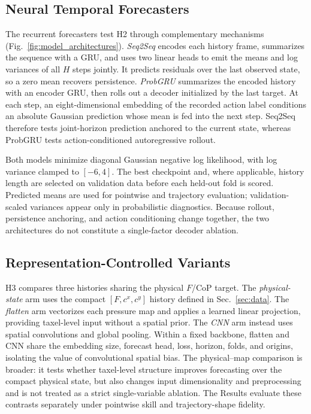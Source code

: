 \documentclass[letterpaper, 10 pt, conference]{ieeeconf}
\begin{document}
\subsection{Neural Temporal Forecasters}
The recurrent forecasters test H2 through complementary mechanisms (Fig.~\ref{fig:model_architectures}). \emph{Seq2Seq} encodes each history frame, summarizes the sequence with a GRU, and uses two linear heads to emit the means and log variances of all $H$ steps jointly. It predicts residuals over the last observed state, so a zero mean recovers persistence. \emph{ProbGRU} summarizes the encoded history with an encoder GRU, then rolls out a decoder initialized by the last target. At each step, an eight-dimensional embedding of the recorded action label conditions an absolute Gaussian prediction whose mean is fed into the next step. Seq2Seq therefore tests joint-horizon prediction anchored to the current state, whereas ProbGRU tests action-conditioned autoregressive rollout.

Both models minimize diagonal Gaussian negative log likelihood, with log variance clamped to $[-6,4]$. The best checkpoint and, where applicable, history length are selected on validation data before each held-out fold is scored. Predicted means are used for pointwise and trajectory evaluation; validation-scaled variances appear only in probabilistic diagnostics. Because rollout, persistence anchoring, and action conditioning change together, the two architectures do not constitute a single-factor decoder ablation.

\subsection{Representation-Controlled Variants}
H3 compares three histories sharing the physical $F$/CoP target. The \emph{physical-state} arm uses the compact $[F,c^x,c^y]$ history defined in Sec.~\ref{sec:data}. The \emph{flatten} arm vectorizes each pressure map and applies a learned linear projection, providing taxel-level input without a spatial prior. The \emph{CNN} arm instead uses spatial convolutions and global pooling. Within a fixed backbone, flatten and CNN share the embedding size, forecast head, loss, horizon, folds, and origins, isolating the value of convolutional spatial bias. The physical--map comparison is broader: it tests whether taxel-level structure improves forecasting over the compact physical state, but also changes input dimensionality and preprocessing and is not treated as a strict single-variable ablation. The Results evaluate these contrasts separately under pointwise skill and trajectory-shape fidelity.
\end{document}
